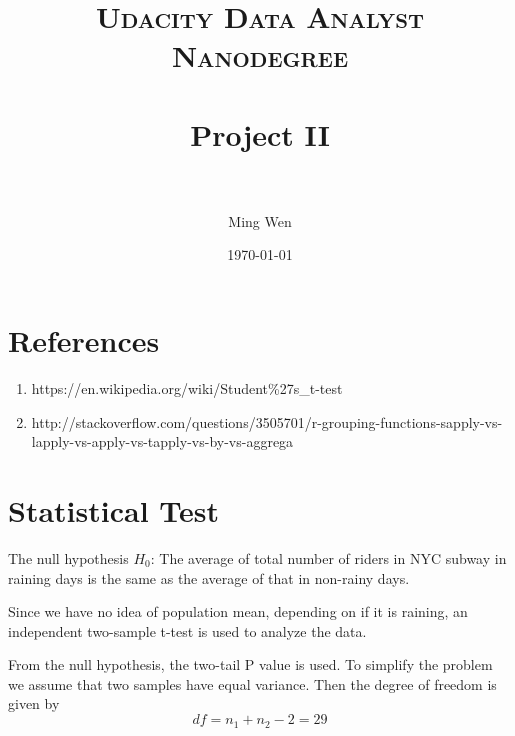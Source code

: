 \documentclass[paper=a4, fontsize=11pt]{scrartcl} %
\title{	
\normalfont \normalsize 
\textsc{Udacity Data Analyst Nanodegree} \\ [25pt] %
\horrule{0.5pt} \\[0.4cm] %
\LARGE{Project II} \\ %
\horrule{0.5pt} \\[0.5cm] %
}
\author{Ming Wen} %
\date{\normalsize\today} %
\numberwithin{equation}{section} %
\numberwithin{figure}{section} %
\numberwithin{table}{section} %
\begin{document}
\maketitle %


\section{References}

\medskip
\noindent{}
\medskip

\begin{enumerate}
	\item https://en.wikipedia.org/wiki/Student\%27s\_t-test
	\item http://stackoverflow.com/questions/3505701/r-grouping-functions-sapply-vs-lapply-vs-apply-vs-tapply-vs-by-vs-aggrega
\end{enumerate}


\section{Statistical Test}

\medskip
\noindent{}
\medskip

The null hypothesis $H_0$: The average of total number of riders in NYC subway
in raining days is the same as the average of that in non-rainy days.

Since we have no idea of population mean, depending on if it is raining,
an independent two-sample t-test is used to analyze the data.

From the null hypothesis, the two-tail P value is used. To simplify the problem
we assume that two samples have equal variance. Then the degree of freedom is given by
\begin{equation}
	df = n_1 + n_2 - 2 = 29
\end{equation}
\end{document}
